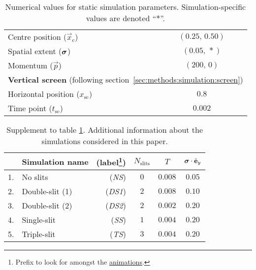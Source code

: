 \begin{table}[ht!]
\begin{tabular}{l|c}
                \hline
                Centre position ($\vec{x}_\mathrm{c}$)  & $(0.25,\,0.50)$           \\
                Spatial extent ($\boldsymbol{\sigma}$)        & $(0.05, \,*)$             \\
                Momentum ($\vec{p}$)                    & $(200,\, 0)$              \\
                \hline
                \multicolumn{2}{l}{\textbf{Vertical screen} (following section~\ref{sec:methods:simulation:screen})} \\
                \hline
                Horizontal position ($x_\mathrm{sc}$)   & $0.8$     \\
                Time point ($t_\mathrm{sc}$)            & $0.002$   \\
                \hline
            \end{tabular}
            \caption{Numerical values for static simulation parameters. Simulation-specific values are denoted ``$*$''.}
            \label{tab:simulation_parameters}
        \end{table}



        \begin{table}[ht!]
            \centering
            \begin{tabular}{clr|ccc}
                \hline
                & Simulation name & (label\footnote{Prefix to look for amongst the \href{\animlink}{animations}.}) & $N_\mathrm{slits}$ & $T$ & $\boldsymbol{\sigma}\cdot \hat{\mathbf{e}}_y$ \\
                \hline
                1. & No slits        & (\textit{NS})   & $0$   & $0.008$   & $0.05$ \\
                2. & Double-slit (1) & (\textit{DS1})  & $2$   & $0.008$   & $0.10$ \\
                3. & Double-slit (2) & (\textit{DS2})  & $2$   & $0.002$   & $0.20$ \\
                4. & Single-slit     & (\textit{SS})   & $1$   & $0.004$   & $0.20$ \\
                5. & Triple-slit     & (\textit{TS})   & $3$   & $0.004$   & $0.20$ \\
                \hline
            \end{tabular}
            \caption{Supplement to table \ref{tab:simulation_parameters}. Additional information about the simulations considered in this paper.}
            \label{tab:simulations_info}
        \end{table}



